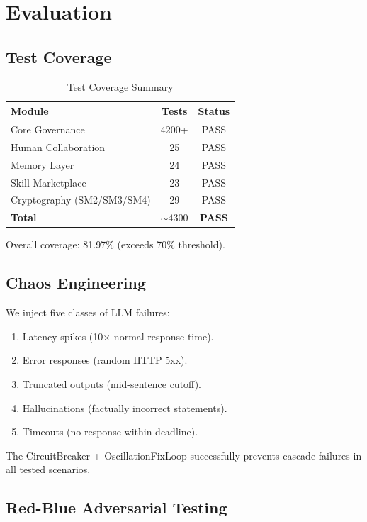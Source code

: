 \documentclass[11pt,a4paper]{article}
\begin{document}
\section{Evaluation}
\label{sec:eval}

\subsection{Test Coverage}

\begin{table}[ht]
\centering
\caption{Test Coverage Summary}
\label{tab:tests}
\begin{tabular}{lcc}
\toprule
Module & Tests & Status \\
\midrule
Core Governance & 4200+ & PASS \\
Human Collaboration & 25 & PASS \\
Memory Layer & 24 & PASS \\
Skill Marketplace & 23 & PASS \\
Cryptography (SM2/SM3/SM4) & 29 & PASS \\
\midrule
\textbf{Total} & \textbf{$\sim 4300$} & \textbf{PASS} \\
\bottomrule
\end{tabular}
\end{table}

Overall coverage: 81.97\% (exceeds 70\% threshold).

\subsection{Chaos Engineering}

We inject five classes of LLM failures:

\begin{enumerate}
  \item Latency spikes (10$\times$ normal response time).
  \item Error responses (random HTTP 5xx).
  \item Truncated outputs (mid-sentence cutoff).
  \item Hallucinations (factually incorrect statements).
  \item Timeouts (no response within deadline).
\end{enumerate}

The CircuitBreaker + OscillationFixLoop successfully prevents cascade failures in all tested scenarios.

\subsection{Red-Blue Adversarial Testing}
\end{document}
